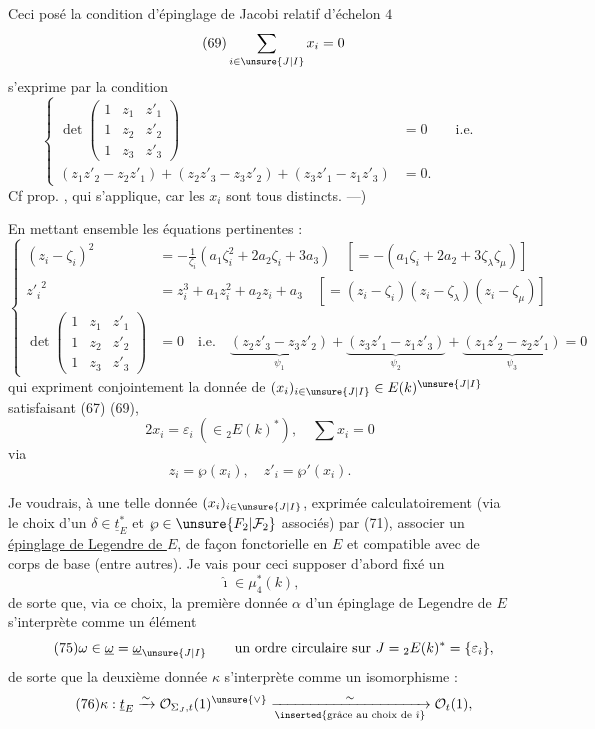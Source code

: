 Ceci posé la condition d'épinglage de Jacobi relatif d'échelon $4$
\[
\tag{69}
\sum_{i\in\unsure{J|I}}x_i=0
\]
s'exprime par la condition
\[
\tag{70}
\left\{\begin{aligned}
\det\begin{pmatrix}
1&z_1&z'_1\\
1&z_2&z'_2\\
1&z_3&z'_3
\end{pmatrix}&=0\qquad\text{i.e.}\\
(z_1z'_2-z_2z'_1)+(z_2z'_3-z_3z'_2)+(z_3z'_1-z_1z'_3)&=0.
\end{aligned}\right.
\]
Cf prop. , qui s'applique, car les $x_i$ sont tous distincts. ---)

En mettant ensemble les équations pertinentes :
\[
\tag{71}
\left\{\begin{aligned}
(z_i-\zeta_i)^2&=-\frac{1}{\zeta_i}(a_1\zeta_i^2+2a_2\zeta_i+3a_3)
\quad[=-(a_1\zeta_i+2a_2+3\zeta_\lambda\zeta_\mu)]\\
{z'_i}^2&=z_i^3+a_1z_i^2+a_2z_i+a_3
\quad[=(z_i-\zeta_i)(z_i-\zeta_\lambda)(z_i-\zeta_\mu)]\\
\det\begin{pmatrix}1&z_1&z'_1\\1&z_2&z'_2\\1&z_3&z'_3\end{pmatrix}&=0
\quad\text{i.e.}\quad
\underbrace{(z_2z'_3-z_3z'_2)}_{\psi_1}
+\underbrace{(z_3z'_1-z_1z'_3)}_{\psi_2}
+\underbrace{(z_1z'_2-z_2z'_1)}_{\psi_3}=0
\end{aligned}\right.
\]
qui expriment conjointement la donnée de $(x_i)_{i\in\unsure{J|I}}\in E(k)^{\unsure{J|I}}$ satisfaisant (67) (69),
\[
\tag{72}
2x_i=\varepsilon_i\ (\in{}_2E(k)^*),\quad \sum x_i=0
\]
via
\[
\tag{73}
z_i=\wp(x_i),\quad z'_i=\wp'(x_i).
\]

Je voudrais, à une telle donnée $(x_i)_{i\in\unsure{J|I}}$, exprimée calculatoirement (via le choix d'un $\delta\in\underline{t}_E^*$ et $\wp\in\unsure{F_2|\mathcal F_2}$ associés) par (71), associer  un \uline{épinglage de Legendre de $E$}, de façon fonctorielle en $E$ et compatible avec  de corps de base (entre autres). Je vais pour ceci supposer d'abord fixé un
\[
\tag{74}
\hat\imath\in\mu_4^*(k),
\]
de sorte que, via ce choix, la première donnée $\alpha$ d'un épinglage de Legendre de $E$ s'interprète comme un élément
\[
\tag{75}
\omega\in\underline{\omega}=\underline{\omega}_{\unsure{J|I}}
\qquad
\text{un ordre circulaire sur }J={}_2E(k)^*=\{\varepsilon_i\},
\]
\margin{$\alpha=\hat\imath\wedge\omega$}
de sorte que la deuxième donnée $\kappa$ s'interprète comme un isomorphisme :
\[
\tag{76}
\kappa:\underline{t}_E\xrightarrow{\sim}
\mathcal O_{\Sigma_J,t}(1)^{\unsure{\vee}}
\xrightarrow[\inserted{\text{grâce au choix de }\hat\imath}]{\sim}
\mathcal O_t(1),
\]

